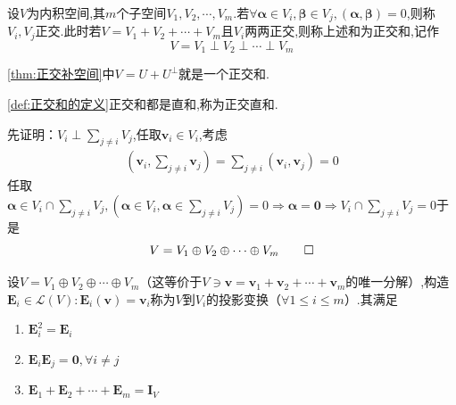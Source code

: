 \begin{formal}
    \begin{definition}[正交和的定义]\label{def:正交和的定义}
        设$V$为内积空间,其$m$个子空间$V_1,V_2,\cdots,V_m$.若$\forall\bm{\alpha}\in V_i,\bm{\beta}\in V_j,\left(\bm{\alpha},\bm{\beta}\right)=0$,则称$V_i,V_j$正交.此时若$V=V_1+V_2+\cdots+V_m$且$V_i$两两正交,则称上述和为正交和,记作\[
        V=V_1\perp V_2\perp\cdots\perp V_m
        \]
    \end{definition}
\end{formal}
\begin{brown}
    \begin{example}
        \cref{thm:正交补空间}中$V=U+U^{\perp}$就是一个正交和.
    \end{example}
\end{brown}
\begin{formal}
    \begin{theorem}[正交直和]\label{thm:正交直和}
        \cref{def:正交和的定义}正交和都是直和,称为正交直和.
    \end{theorem}
    \begin{Proof}
        先证明：$\displaystyle V_i\perp\sum_{j\neq i}V_j$,任取$\bm{v}_i\in V_i$,考虑\begin{align*}
            \left(
                \bm{v}_i,\sum_{j\neq i}\bm{v}_j
            \right)=\sum_{j\neq i}\left(
                \bm{v}_i,\bm{v}_j
            \right)=0
        \end{align*}任取$\displaystyle\bm{\alpha}\in V_i\cap\sum_{j\neq i}V_j,\left(\bm{\alpha}\in V_i,\bm{\alpha}\in\sum_{j\neq i}V_j\right)=0\Longrightarrow\bm{\alpha}=\bm{0}\Longrightarrow V_i\cap\sum_{j\neq i}V_j=0$于是\[
        V=V_1\oplus V_2\oplus\cdots\oplus V_m\qedhere
        \]
    \end{Proof}
\end{formal}
\begin{formal}
    \begin{definition}[投影变换的定义]\label{def:投影变换的定义}
        设$V=V_1\oplus V_2\oplus \cdots\oplus V_m$（这等价于$V\ni\bm{v}=\bm{v}_1+\bm{v}_2+\cdots+\bm{v}_m$的唯一分解）,构造$\bm{E}_i\in \mathcal{L}\left(V\right):\bm{E}_i\left(\bm{v}\right)=\bm{v}_i$称为$V$到$V_i$的投影变换（$\forall1\leqslant i\leqslant m$）.其满足\begin{enumerate}[label={\textup{(\arabic*)}}]
            \item $\bm{E}_i^2=\bm{E}_i$
            \item $\bm{E}_i\bm{E}_j=\bm{0},\forall i\neq j$
            \item $\bm{E}_1+\bm{E}_2+\cdots+\bm{E}_m=\bm{I}_V$
        \end{enumerate}
    \end{definition}
\end{formal}

